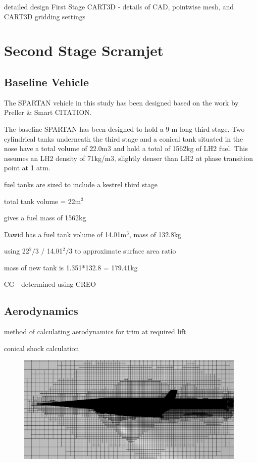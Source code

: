 	detailed design
	First Stage CART3D
	- details of CAD, pointwise mesh, and CART3D gridding settings
	
	
	\section{Second Stage Scramjet}
		\subsection{Baseline Vehicle}
		The SPARTAN vehicle in this study has been designed based on the work by Preller \& Smart CITATION. 
		
		The baseline SPARTAN has been designed to hold a 9 m long third stage.  Two cylindrical tanks underneath the third stage and a conical tank situated in the nose have a total volume of 22.0m3 and hold a total of 1562kg of LH2 fuel. This assumes an LH2 density of 71kg/m3, slightly denser than LH2 at phase transition point at 1 atm.
		
		
		
		
		
		
		
		fuel tanks are sized to include a kestrel third stage
		
		total tank volume = 22m$^3$
		
		gives a fuel mass of 1562kg
		
		
		
		Dawid has a fuel tank volume of 14.01m$^3$, mass of 132.8kg
		
		using 22$^2/3$  /  14.01$^2/3$  to approximate surface area ratio
		
		mass of new tank is 1.351*132.8 = 179.41kg
		
		
		CG - determined using CREO
		
		\subsection{Aerodynamics}
		method of calculating aerodynamics for trim at required lift
		
		conical shock calculation
		
		\begin{figure}
\centering
\includegraphics[width=0.7\linewidth]{figures/3_vehicle_design/CARTmesh}
\caption{}
\label{fig:CARTmesh}
\end{figure}


